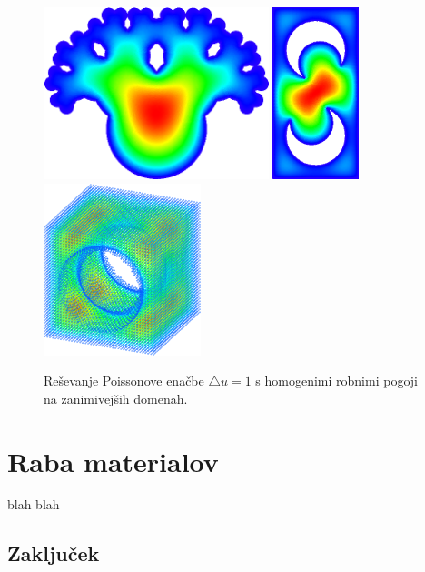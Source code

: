 \documentclass[12pt,a4paper]{article}
\theoremstyle{definition} %
\theoremstyle{plain} %
\numberwithin{equation}{section}
\begin{document}
\begin{figure}[h]
  \centering
  \includegraphics[height=5cm]{images/poisson_weird1.png}
  \hspace{10pt}
  \includegraphics[height=5cm]{images/poisson_weird2.png}
  \hspace{10pt}
  \includegraphics[height=5cm]{images/poisson_weird3.png}
  \caption{Reševanje Poissonove enačbe $\triangle u = 1$ s homogenimi robnimi pogoji na
  zanimivejših domenah.}
  \label{fig:poisson-square-weird}
\end{figure}

\section{Raba materialov}
blah blah


\subsection{Zaključek}

\clearpage


\end{document}
